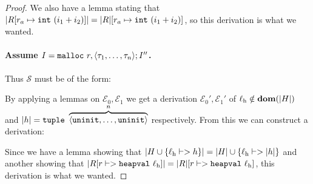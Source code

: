 \begin{proof}
  We also have a lemma stating that
  $|\high R[r_a \mapsto \mathtt{int}\ (i_1 + i_2)]| = |\high R| [r_a \mapsto
  \mathtt{int}\ (i_1 + i_2)]$, so this derivation is what we wanted.

  \paragraph{Assume $\high I = \mathtt{malloc}\ r, \langle \tau_1, \dots, \tau_n \rangle ; \high I''$.}

  Thus $\mathcal{S}$ must be of the form:

  \begin{mathpar}
  \end{mathpar}

  By applying a lemmas on $\mathcal{E}_0, \mathcal{E}_1$ we get a derivation
  $\mathcal{E}_0', \mathcal{E}_1'$ of
  $\ell_{\mathrm{h}} \notin \mathbf{dom}(|\high H|)$ and
  $|\high h| = \mathtt{tuple}\ \overbrace{\langle \mathtt{uninit}, \dots,
    \mathtt{uninit} \rangle}^n$ respectively. From this we can construct a derivation:

  \begin{mathpar}
  \end{mathpar}

  Since we have a lemma showing that
  $|\high H \cup \{\ell_{\mathrm{h}} |-> \high h\}| = |\high H|
  \cup \{\ell_{\mathrm{h}} |-> |\high h|\}$ and another showing that
  $|\high R[r |-> \mathtt{heapval}\ \ell_{\mathrm{h}}]| = |\high
  R| [r |-> \mathtt{heapval}\ \ell_{\mathrm{h}}]$, this derivation is
  what we wanted.
\end{proof}

